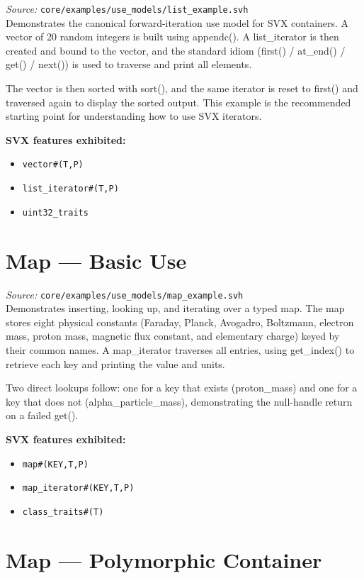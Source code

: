 \documentclass[11pt,letterpaper]{report}
\begin{document}
\textit{Source:} \texttt{core/examples/use\_models/list\_example.svh}\\

Demonstrates the canonical forward-iteration use model for SVX containers. A vector of 20 random integers is built using appendc(). A list\_iterator is then created and bound to the vector, and the standard idiom (first() / at\_end() / get() / next()) is used to traverse and print all elements.

The vector is then sorted with sort(), and the same iterator is reset to first() and traversed again to display the sorted output. This example is the recommended starting point for understanding how to use SVX iterators.

\textbf{SVX features exhibited:}

\begin{itemize}
  \item \texttt{vector\#(T,P)}
  \item \texttt{list\_iterator\#(T,P)}
  \item \texttt{uint32\_traits}
\end{itemize}
\section{Map --- Basic Use}

\textit{Source:} \texttt{core/examples/use\_models/map\_example.svh}\\

Demonstrates inserting, looking up, and iterating over a typed map. The map stores eight physical constants (Faraday, Planck, Avogadro, Boltzmann, electron mass, proton mass, magnetic flux constant, and elementary charge) keyed by their common names. A map\_iterator traverses all entries, using get\_index() to retrieve each key and printing the value and units.

Two direct lookups follow: one for a key that exists (proton\_mass) and one for a key that does not (alpha\_particle\_mass), demonstrating the null-handle return on a failed get().

\textbf{SVX features exhibited:}

\begin{itemize}
  \item \texttt{map\#(KEY,T,P)}
  \item \texttt{map\_iterator\#(KEY,T,P)}
  \item \texttt{class\_traits\#(T)}
\end{itemize}
\section{Map --- Polymorphic Container}
\end{document}
